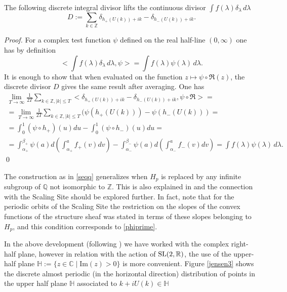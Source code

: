 \documentclass[graybox, envcountsect%
]{svmult}
\def\SL{{\rm SL}}
\def\C{{\mathbb C}}
\def\Q{{\mathbb Q}}
\def\R{{\mathbb R}}
\def\Z{{\mathbb Z}}
\def\H{{\mathbb H}}
\def\no{\noindent}
\def\im{{\mbox{Im}}}
\begin{document}
\begin{lemma}\label{lift} The following discrete integral divisor lifts the continuous divisor $\int f(\lambda) \delta_\lambda\, d\lambda$
\begin{equation}\label{lifted}
D:=\sum_{k\in \Z} 	\delta_{h_+(U(k))+ik}-\delta_{h_-(U(k))+ik}.
\end{equation}	
\end{lemma}
\begin{proof} For a complex test function $\psi$ defined  on the real half-line $(0,\infty)$ one has by definition
$$
<\int f(\lambda) \delta_\lambda\, d\lambda,\psi>=\int f(\lambda) \psi(\lambda)\, d\lambda.
$$
It is enough to show that when evaluated on the function $z\mapsto \psi\circ \Re(z)$, the discrete divisor $D$ gives the same result after averaging. One has 
\begin{multline*}
\lim_{T\to \infty}\frac{1}{2T}\sum_{k\in \Z,\vert k\vert\leq T} 	<\delta_{h_+(U(k))+ik}-\delta_{h_-(U(k))+ik},\psi\circ \Re >=\\
=\lim_{T\to \infty}\frac{1}{2T}\sum_{k\in \Z,\vert k\vert\leq T}(\psi(h_+(U(k)))- 
\psi(h_-(U(k)))=\\
=\int_0^1 (\psi \circ h_+)(u)du-\int_0^1 (\psi \circ h_-)(u)du=\\
=\int_{\alpha_+}^{\beta_+}\psi(a)d\left(\int_{\alpha_+}^a f_+ (v)dv\right)
-\int_{\alpha_-}^{\beta_-}\psi(a)d\left(\int_{\alpha_-}^a f_- (v)dv\right)
=\int f(\lambda) \psi(\lambda)\, d\lambda.
\end{multline*}
\qed\end{proof}

\begin{rem}
The construction as in \eqref{seqq} generalizes when $H_p$ is replaced by any infinite subgroup of $\Q$  not isomorphic to $\Z$. This is also   explained in \cite{JT} and the connection with the Scaling Site should be explored further. In fact, note that for the periodic orbits of the Scaling Site the restriction on the slopes of the convex functions of the structure sheaf was stated in terms of these slopes belonging to $H_p$, and this condition corresponds to \eqref{phiprime}.
\end{rem}

\no In the above development (following \cite{JT}) we have worked with the  complex right-half plane, however in relation with the action of $\SL(2,\R)$, the use of the upper-half plane $\H:=\{z\in \C\mid \im(z)>0\}$ is more convenient.\newline
  Figure \ref{jensen3} shows the discrete almost periodic (in the horizontal direction) distribution of points in the upper half plane $\H$ associated to $k+iU(k)\in \H$
  
\end{document}
